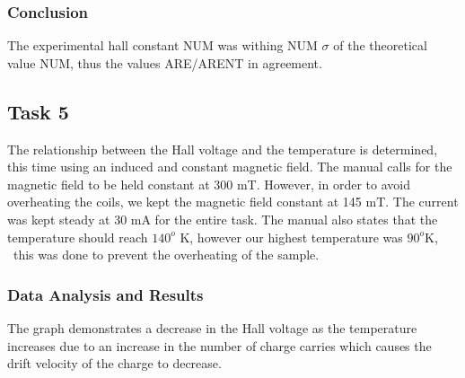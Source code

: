 \documentclass[a4paper]{article}
\begin{document}
\begin{figure}[H]
\centering
\label{task24plot}
\end{figure}








\subsubsection{Conclusion}
The experimental hall constant NUM was withing NUM $\sigma$ of the theoretical value NUM, thus the values ARE/ARENT in agreement.

\subsection{Task 5}

\qq The relationship between the Hall voltage and the temperature is
determined, this time using an induced and constant magnetic
field. The manual calls for the magnetic field to be held constant at
300 mT. However, in order to avoid overheating the coils, we kept the
magnetic field constant at 145 mT. The current was kept steady at 30
mA for the entire task. The manual also states that the temperature
should reach $140^o$ K, however our highest temperature was $90^o$K, \
this was done to prevent the overheating of the sample.


\subsubsection{Data Analysis and Results}
\qq The graph demonstrates a decrease in the Hall voltage as the
temperature increases due to an increase in the number of charge
carries which causes the drift velocity of the charge to decrease.
\end{document}
